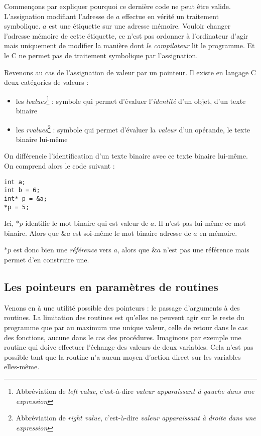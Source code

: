 \documentclass[../../../main.tex]{subfiles}
\begin{document}
Commençons par expliquer pourquoi ce dernière code ne peut être valide. L'assignation modifiant l'adresse de $a$ effectue en vérité un traitement symbolique. $a$ est une étiquette sur une adresse mémoire. Vouloir changer l'adresse mémoire de cette étiquette, ce n'est pas ordonner à l'ordinateur d'agir mais uniquement de modifier la manière dont \textit{le compilateur} lit le programme. Et le C ne permet pas de traitement symbolique par l'assignation.

Revenons au cas de l'assignation de valeur par un pointeur. Il existe en langage C deux catégories de valeurs :
\begin{itemize}
	\item les \textit{lvalues}\footnote{Abbréviation de \textit{left value}, c'est-à-dire \textit{valeur apparaissant à gauche dans une expression}} : symbole qui permet d'évaluer l'\textit{identité} d'un objet, d'un texte binaire
	\item les \textit{rvalues}\footnote{Abbréviation de \textit{right value}, c'est-à-dire \textit{valeur apparaissant à droite dans une expression}} : symbole qui permet d'évaluer la \textit{valeur} d'un opérande, le texte binaire lui-même
\end{itemize}
On différencie l'identification d'un texte binaire avec ce texte binaire lui-même. On comprend alors le code suivant :
\begin{verbatim}
int a;
int b = 6;
int* p = &a;
*p = 5;
\end{verbatim}
Ici, $*p$ identifie le mot binaire qui est valeur de $a$. Il n'est pas lui-même ce mot binaire. Alors que $\&a$ est soi-même le mot binaire adresse de $a$ en mémoire.

$*p$ est donc bien une \textit{référence} vers $a$, alors que $\&a$ n'est pas une référence mais permet d'en construire une.
\subsection{Les pointeurs en paramètres de routines}
\label{sub:les_pointeurs_en_param_tres_de_routines}
Venons en à une utilité possible des pointeurs : le passage d'arguments à des routines. La limitation des routines est qu'elles ne peuvent agir sur le reste du programme que par au maximum une unique valeur, celle de retour dans le cas des fonctions, aucune dans le cas des procédures. Imaginons par exemple une routine qui doive effectuer l'échange des valeurs de deux variables. Cela n'est pas possible tant que la routine n'a aucun moyen d'action direct sur les variables elles-même.
\end{document}
